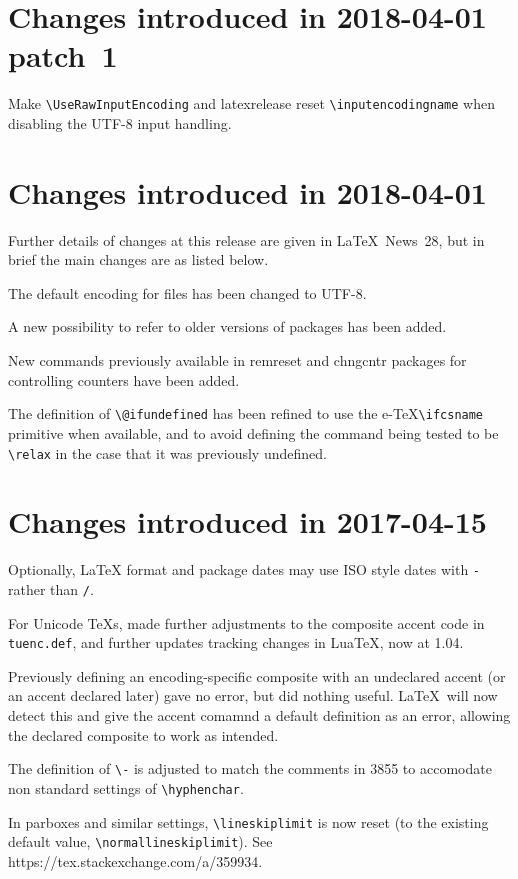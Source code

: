 \documentclass{ltxguide}
\newcommand\Lpack[1]{\mbox{\textsf{#1}}}
\newcommand\gnatsissue[1]{#1}
\newcommand\ltnewsissue[1]{\LaTeX\ News~#1}
\newcommand\sxanswer[1]{https://tex.stackexchange.com\slash a\slash #1}
\newcommand\gnatsissue[1]{%
    \href{https://www.latex-project.org/cgi-bin/ltxbugs2html?pr=latex/#1}{#1}}
\newcommand\ltnewsissue[1]{%
    \href{https://www.latex-project.org/news/latex2e-news/ltnews#1.pdf}{\LaTeX\ News~#1}}
\newcommand\sxanswer[1]{%
     \url{https://tex.stackexchange.com/a/#1}}
\begin{document}
\section{Changes  introduced in 2018-04-01 patch~1}
Make \verb|\UseRawInputEncoding| and \Lpack{latexrelease} reset \verb|\inputencodingname|
when disabling the UTF-8 input handling.

\section{Changes  introduced in 2018-04-01}
Further details of changes at this release are given in \ltnewsissue{28}, but in brief
the main changes are as listed below.

The default encoding for files has been changed to UTF-8.

A new possibility to refer to older versions of packages has been added.

New commands previously available in \Lpack{remreset} and
\Lpack{chngcntr} packages for controlling counters have been added.

The definition of \verb|\@ifundefined| has been refined to use the e-\TeX \verb|\ifcsname|
primitive when available, and to avoid defining the command being tested to be \verb|\relax|
in the case that it was previously undefined.

\section{Changes  introduced in 2017-04-15}
Optionally, \LaTeX{} format and package dates may use ISO style dates with
\texttt{-}  rather than \texttt{/}.

For Unicode \TeX{}s, made further adjustments to the composite accent
code in \texttt{tuenc.def}, and further updates tracking changes in
Lua\TeX, now at 1.04.

Previously defining an encoding-specific composite with an undeclared
accent (or an accent declared later) gave no error, but did nothing useful.
\LaTeX\ will now detect this and give the accent comamnd a default definition
as an error, allowing the declared composite to work as intended.

The definition of \verb|\-| is adjusted to match the comments in
\gnatsissue{3855} to accomodate non standard settings of \verb|\hyphenchar|.

In parboxes and similar settings, \verb|\lineskiplimit| is now
reset (to the existing default value, \verb|\normallineskiplimit|).
See \sxanswer{359934}.
\end{document}
